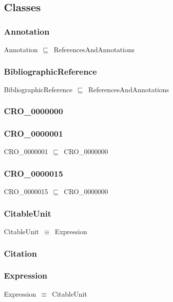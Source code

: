 \documentclass{article}
\begin{document}
\subsection*{Classes}

\subsubsection*{Annotation}

Annotation~\ensuremath{\sqsubseteq}~ReferencesAndAnnotations~

\subsubsection*{BibliographicReference}

BibliographicReference~\ensuremath{\sqsubseteq}~ReferencesAndAnnotations~

\subsubsection*{CRO\_0000000}

\subsubsection*{CRO\_0000001}

CRO\_0000001~\ensuremath{\sqsubseteq}~CRO\_0000000~

\subsubsection*{CRO\_0000015}

CRO\_0000015~\ensuremath{\sqsubseteq}~CRO\_0000000~

\subsubsection*{CitableUnit}

CitableUnit~\ensuremath{\equiv}~Expression

\subsubsection*{Citation}

\subsubsection*{Expression}

Expression~\ensuremath{\equiv}~CitableUnit
\end{document}
